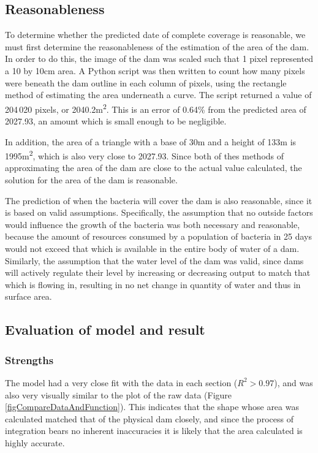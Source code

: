\documentclass[a4paper]{article}
\theoremstyle{definition}
\begin{document}
    \subsection{Reasonableness}
        To determine whether the predicted date of complete coverage is reasonable, we must first determine the reasonableness of the estimation of the area of the dam. In order to do this, the image of the dam was scaled such that 1 pixel represented a 10 by 10cm area. A Python script was then written to count how many pixels were beneath the dam outline in each column of pixels, using the rectangle method of estimating the area underneath a curve. The script returned a value of 204\,020 pixels, or 2040.2m\textsuperscript{2}. This is an error of 0.64\% from the predicted area of 2027.93, an amount which is small enough to be negligible.

        In addition, the area of a triangle with a base of 30m and a height of 133m is 1995m\textsuperscript{2}, which is also very close to 2027.93. Since both of thes methods of approximating the area of the dam are close to the actual value calculated, the solution for the area of the dam is reasonable.

        The prediction of when the bacteria will cover the dam is also reasonable, since it is based on valid assumptions. Specifically, the assumption that no outside factors would influence the growth of the bacteria was both necessary and reasonable, because the amount of resources consumed by a population of bacteria in 25 days would not exceed that which is available in the entire body of water of a dam. Similarly, the assumption that the water level of the dam was valid, since dams will actively regulate their level by increasing or decreasing output to match that which is flowing in, resulting in no net change in quantity of water and thus in surface area.


    \subsection{Evaluation of model and result}

        \subsubsection{Strengths}
            The model had a very close fit with the data in each section ($R^2 > 0.97$), and was also very visually similar to the plot of the raw data (Figure \ref{figCompareDataAndFunction}). This indicates that the shape whose area was calculated matched that of the physical dam closely, and since the process of integration bears no inherent inaccuracies it is likely that the area calculated is highly accurate.
\end{document}
